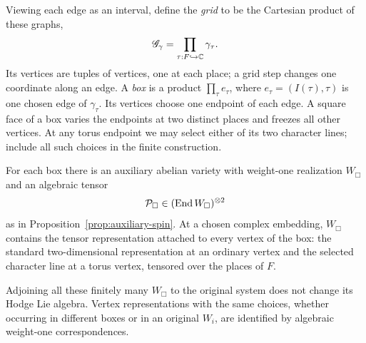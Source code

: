 Viewing each edge as an interval, define the \emph{grid} to be the
Cartesian product of these graphs,
\[
 \mathscr G_\gamma=
       \prod_{\tau:F\hookrightarrow\mathbb C}\gamma_\tau.
\]
Its vertices are tuples of vertices, one at each place; a grid step
changes one coordinate along an edge.  A \emph{box} is a product
\(\prod_\tau e_\tau\), where $e_\tau=(I(\tau),\tau)$ is one
chosen edge of $\gamma_\tau$.  Its vertices choose one endpoint of
each edge.  A square face of a box varies the endpoints at two distinct
places and freezes all other vertices.  At any torus endpoint we may
select either of its two character lines; include all such choices in
the finite construction.

\begin{lemma}\label{lem:mixed-box}
For each box there is an auxiliary abelian variety with weight-one
realization $W_{\Box}$ and an algebraic tensor
\[
 \mathcal P_{\Box}\in(\operatorname{End} W_{\Box})^{\otimes2}
\]
as in Proposition~\ref{prop:auxiliary-spin}.  At a chosen complex
embedding, $W_{\Box}$ contains the tensor representation attached
to every vertex of the box: the standard two-dimensional representation
at an ordinary vertex and the selected character line at a torus
vertex, tensored over the places of $F$.

Adjoining all these finitely many $W_{\Box}$ to the original system
does not change its Hodge Lie algebra.  Vertex representations with
the same choices, whether occurring in different boxes or in an
original $W_i$, are identified by algebraic weight-one correspondences.
\end{lemma}


